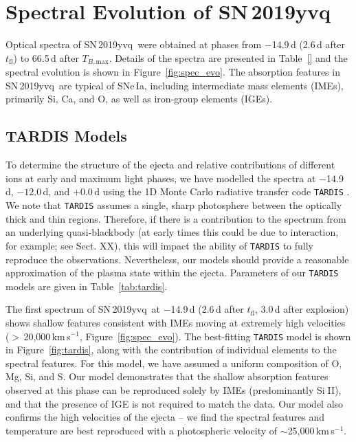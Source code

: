 \documentclass[twocolumn]{aastex63}
\def\ion#1#2{#1$\;${\footnotesize\rm{#2}}\relax}
\newcommand{\tfl}{$t_\mathrm{fl}$}
\newcommand{\tbmax}{$T_{B,\mathrm{max}}$}
\newcommand{\kms}{km\,s$^{-1}$}
\newcommand{\sn}{SN\,2019yvq}
\begin{document}
\section{Spectral Evolution of \sn}\label{sec:spec}


Optical spectra of \sn\ were obtained at phases from $-$14.9\,d (2.6\,d after
\tfl) to 66.5\,d after \tbmax. Details of the spectra are presented in
Table~\ref{} and the spectral evolution is shown in Figure~\ref{fig:spec_evo}.
The absorption features in \sn\ are typical of SNe\,Ia, including intermediate
mass elements (IMEs), primarily Si, Ca, and O, as well as iron-group elements
(IGEs). 

\subsection{TARDIS Models}\label{sec:tardis}

To determine the structure of the ejecta and relative contributions of
different ions at early and maximum light phases, we have modelled the spectra
at $-$14.9\,d, $-12.0$\,d, and $+$0.0\,d using the 1D Monte Carlo radiative
transfer code \texttt{TARDIS} \citep{Kerzendorf14}. We note that \texttt{TARDIS} assumes a single, sharp photosphere between the optically thick and thin regions. Therefore, if there is a contribution to the spectrum from an underlying quasi-blackbody (at early times this could be due to interaction, for example; see Sect. XX), this will impact the ability of \texttt{TARDIS} to fully reproduce the observations. Nevertheless, our models should provide a reasonable approximation of the plasma state within the ejecta.
Parameters of our \texttt{TARDIS} models are given in Table~\ref{tab:tardis}. 



The first spectrum of \sn\ at $-$14.9\,d (2.6\,d after \tfl, 3.0\,d after explosion) shows shallow
features consistent with IMEs moving at extremely high velocities
($>$\,20,000\,\kms, Figure~\ref{fig:spec_evo}). The best-fitting
\texttt{TARDIS} model is shown in Figure~\ref{fig:tardis}, along with the contribution of individual elements to the spectral features. For this model, we have assumed a uniform composition of O, Mg, Si, and S. Our model
demonstrates that the shallow absorption features observed at this phase can
be reproduced solely by IMEs (predominantly \ion{Si}{II}), and that the
presence of IGE is not required to match the data. Our model also
confirms the high velocities of the ejecta -- we find the spectral features
and temperature are best reproduced with a photospheric velocity of
$\sim$25,000\,\kms. %
\end{document}
